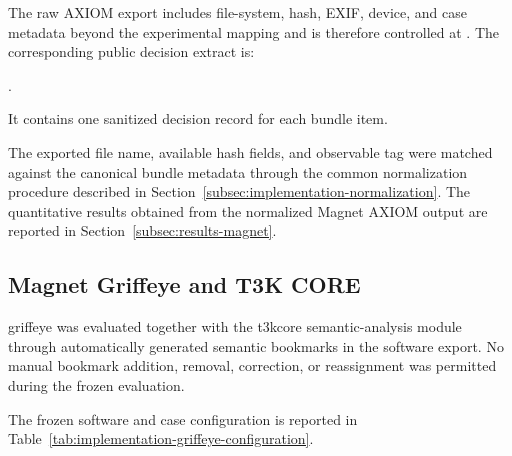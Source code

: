 The raw AXIOM export includes file-system, hash, EXIF, device, and case metadata
beyond the experimental mapping and is therefore controlled at
.
The corresponding public decision extract is:

\smallskip
\noindent
{}.
\smallskip

It contains one sanitized decision record for each bundle item.

The exported file name, available hash fields, and observable tag were matched
against the canonical bundle metadata through the common normalization
procedure described in
Section~\ref{subsec:implementation-normalization}. The quantitative results
obtained from the normalized Magnet AXIOM output are reported in
Section~\ref{subsec:results-magnet}.

\subsection{Magnet Griffeye and T3K CORE}
\label{subsec:implementation-griffeye}

\gls{griffeye} was evaluated together with the \gls{t3kcore}
semantic-analysis module through automatically generated semantic bookmarks in
the software export. No manual bookmark addition, removal, correction, or
reassignment was permitted during the frozen evaluation.

The frozen software and case configuration is reported in
Table~\ref{tab:implementation-griffeye-configuration}.

